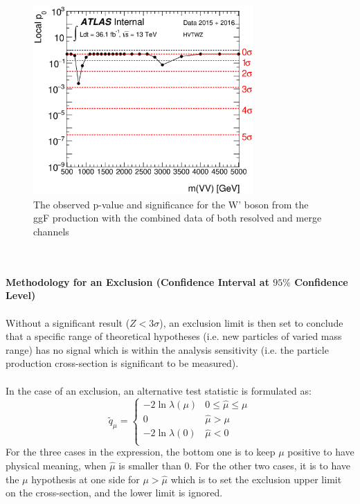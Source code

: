 \begin{figure}
	\includegraphics[width=0.75\textwidth]{Chapter4/VVM_p0_HVTWZ_ggF.eps}
	\caption{The observed p-value and significance for the W' boson from the ggF production with the combined data of both resolved and merge channels }
	\label{Fig:pvalue_hvt}
\end{figure}
\noindent
\\
\\{\bf Methodology for an Exclusion (Confidence Interval at $95\%$ Confidence Level)}
\\
\\Without a significant result ($Z<3\sigma$), an exclusion limit is then set to conclude that a specific range of theoretical hypotheses (i.e. new particles of varied mass range) has no signal which is within the analysis sensitivity (i.e. the particle production cross-section is significant to be measured). 
\\
\\In the case of an exclusion, an alternative test statistic is formulated as:
\begin{equation}
\tilde{q}_{\mu} = 
\begin{cases}
-2 \ln \lambda(\mu) & 0 \le \hat{\mu} \le \mu \\
0 & \hat{\mu} > \mu \\
-2 \ln \lambda(0) & \hat{\mu} < 0 \\
\end{cases}
\label{Eq:Sig_testQ}
\end{equation}
For the three cases in the expression, the bottom one is to keep $\mu$ positive to have physical meaning, when $\hat{\mu}$ is smaller than 0. For the other two cases, it is to have the $\mu$ hypothesis at one side for $\mu>\hat{\mu}$ which is to set the exclusion upper limit on the cross-section, and the lower limit is ignored. 
